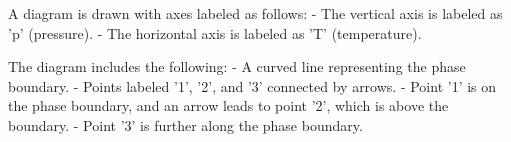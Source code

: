 A diagram is drawn with axes labeled as follows:  
- The vertical axis is labeled as 'p' (pressure).  
- The horizontal axis is labeled as 'T' (temperature).  

The diagram includes the following:  
- A curved line representing the phase boundary.  
- Points labeled '1', '2', and '3' connected by arrows.  
- Point '1' is on the phase boundary, and an arrow leads to point '2', which is above the boundary.  
- Point '3' is further along the phase boundary.